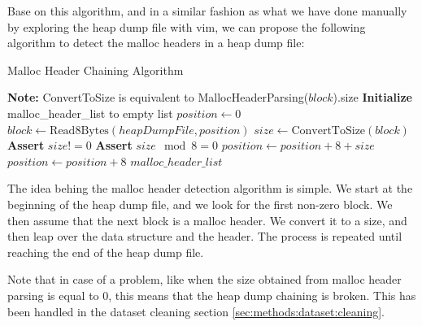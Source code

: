     Base on this algorithm, and in a similar fashion as what we have done manually by exploring the heap dump file with vim, we can propose the following algorithm to detect the malloc headers in a heap dump file:

    \begin{algorithm}[H]
        \caption{Malloc Header Chaining Algorithm}
        \begin{algorithmic}[1]
            \State \textbf{Note:} ConvertToSize is equivalent to MallocHeaderParsing($block$).size
            \State \textbf{Initialize} malloc\_header\_list to empty list
            \State $position \gets 0$
                \State $block \gets \text{Read8Bytes}(heapDumpFile, position)$
                    \State $size \gets \text{ConvertToSize}(block)$ 
                    \State \textbf{Assert} $size != 0$
                    \State \textbf{Assert} $size \mod 8 = 0$ 
                    \State $position \gets position + 8 + size$ 
                \Else
                    \State $position \gets position + 8$
                \EndIf
            \EndWhile
            \State \Return $malloc\_header\_list$
        \EndProcedure
        \end{algorithmic}
    \end{algorithm}

    The idea behing the malloc header detection algorithm is simple. We start at the beginning of the heap dump file, and we look for the first non-zero block. We then assume that the next block is a malloc header. We convert it to a size, and then leap over the data structure and the header. The process is repeated until reaching the end of the heap dump file.

    Note that in case of a problem, like when the size obtained from malloc header parsing is equal to 0, this means that the heap dump chaining is broken. This has been handled in the dataset cleaning section \ref{sec:methods:dataset:cleaning}.



